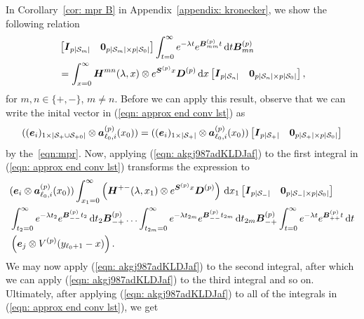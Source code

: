 In Corollary~\ref{cor: mpr B} in Appendix~\ref{appendix: kronecker}, we show the following relation
\begin{align}
	&\vligne{\bs I_{p|\calS_m|} & \bs 0_{p|\calS_m|\times p|\calS_0|} }\int_{t=0}^\infty e^{-\lambda t} e^{\bs{B}^{(p)}_{mm}t} \wrt t \bs{B}^{(p)}_{m{n}} \nonumber %
	\\&= \int_{x=0}^\infty \bs H^{mn}(\lambda,x)  \otimes  e^{\bs S^{(p)} x}\bs D^{(p)}\wrt x \vligne{\bs I_{p|\calS_n|} & \bs 0_{p|\calS_n|\times p|\calS_0|}}, \label{eqn: akgj987adKLDJaf}
\end{align}
for \(m,n\in\{+,-\}\), \(m\neq n\). Before we can apply this result, observe that we can write the inital vector in (\ref{eqn: approx end conv lst}) as 
\[((\boldsymbol e_i)_{1\times |\mathcal{S}_+\cup\mathcal{S}_{+0}|}\otimes \boldsymbol  a_{\ell_0,i}^{(p)}(x_0)) = ((\boldsymbol e_i)_{1\times |\mathcal{S}_+|}\otimes \boldsymbol  a_{\ell_0,i}^{(p)}(x_0))\begin{bmatrix} \boldsymbol I_{p|\mathcal{S}_+|} & \boldsymbol 0_{p|\mathcal{S}_+|\times p|\mathcal{S}_0|} \end{bmatrix}\]
by the~\ref{eqn:mpr}. 
Now, applying (\ref{eqn: akgj987adKLDJaf}) to the first integral in (\ref{eqn: approx end conv lst}) transforms the expression to 
\begin{align}
	&(\boldsymbol e_i\otimes \boldsymbol  a_{\ell_0,i}^{(p)}(x_0)) \int_{x_1=0}^\infty \left(\boldsymbol H^{+{-}}(\lambda,x_1) \otimes e^{\boldsymbol S^{(p)} x}\boldsymbol D^{(p)}\right) \, \mathrm{d} x_1 \begin{bmatrix} \boldsymbol I_{p|\mathcal{S}_-|} & \boldsymbol 0_{p|\mathcal{S}_-|\times p|\mathcal{S}_0|} \end{bmatrix} \nonumber
	\\&\int_{t_2=0}^\infty e^{-\lambda t_2} e^{\boldsymbol{B}^{(p)}_{--}t_2} \, \mathrm{d} t_2\boldsymbol{B}^{(p)}_{-{+}} 
	\hdots 
	\int_{t_{2m}=0}^\infty e^{-\lambda t_{2m}}e^{\boldsymbol{B}^{(p)}_{--}t_{2m}} \, \mathrm{d} t_{2m}\boldsymbol{B}^{(p)}_{-{+}} 
	\int_{t=0}^\infty e^{-\lambda t}e^{\boldsymbol{B}^{(p)}_{++}t} \, \mathrm{d} t \nonumber
	\\&\left(\boldsymbol e_j \otimes V^{(p)}(y_{\ell_0+1}-x)\right). \label{eqn: approx end conv lst2}
\end{align}
We may now apply (\ref{eqn: akgj987adKLDJaf}) to the second integral, after which we can apply (\ref{eqn: akgj987adKLDJaf}) to the third integral and so on. Ultimately, after applying (\ref{eqn: akgj987adKLDJaf}) to all of the integrals in (\ref{eqn: approx end conv lst}), we get 
